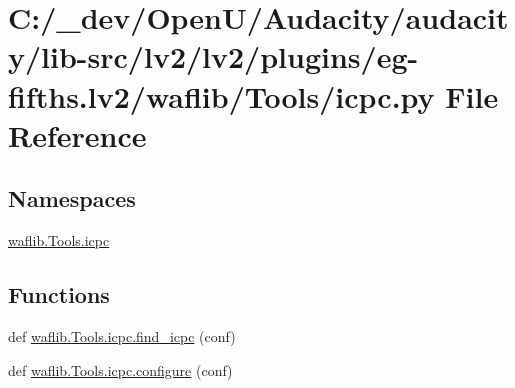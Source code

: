 \hypertarget{lv2_2plugins_2eg-fifths_8lv2_2waflib_2_tools_2icpc_8py}{}\section{C\+:/\+\_\+dev/\+Open\+U/\+Audacity/audacity/lib-\/src/lv2/lv2/plugins/eg-\/fifths.lv2/waflib/\+Tools/icpc.py File Reference}
\label{lv2_2plugins_2eg-fifths_8lv2_2waflib_2_tools_2icpc_8py}
\subsection*{Namespaces}
\begin{DoxyCompactItemize}
\item 
 \hyperlink{namespacewaflib_1_1_tools_1_1icpc}{waflib.\+Tools.\+icpc}
\end{DoxyCompactItemize}
\subsection*{Functions}
\begin{DoxyCompactItemize}
\item 
def \hyperlink{namespacewaflib_1_1_tools_1_1icpc_a3f1e8dd3ca1313cf570316c73027db11}{waflib.\+Tools.\+icpc.\+find\+\_\+icpc} (conf)
\item 
def \hyperlink{namespacewaflib_1_1_tools_1_1icpc_ac5e97f409d9392b945bef908e0e7f9cd}{waflib.\+Tools.\+icpc.\+configure} (conf)
\end{DoxyCompactItemize}
